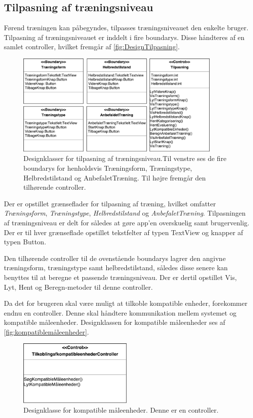 \subsection*{Tilpasning af træningsniveau}
Førend træningen kan påbegyndes, tilpasses træningsniveauet den enkelte bruger. Tilpasning af træningsniveauet er inddelt i fire boundarys. Disse håndteres af en samlet controller, hvilket fremgår af \autoref{fig:DesignTilpasning}.

\begin{figure} [H]
\centering
\includegraphics[width=0.9\textwidth]{figures/MVC/MVCTilpasning}
\caption{Designklasser for tilpasning af træningsniveau.Til venstre ses de fire boundarys for henholdsvis Træningsform, Træningstype, Helbredstilstand og AnbefaletTræning. Til højre fremgår den tilhørende controller.}
\label{fig:DesignTilpasning}
\end{figure}

\noindent
Der er opstillet grænseflader for tilpasning af træning, hvilket omfatter \textit{Træningsform}, \textit{Træningstype}, \textit{Helbredstilstand} og \textit{AnbefaletTræning}. Tilpasningen af træningsniveau er delt for således at gøre app’en overskuelig samt brugervenlig. Der er til hver grænseflade opstillet tekstfelter af typen TextView og knapper af typen Button.   

Den tilhørende controller til de ovenstående boundarys lagrer den angivne træningsform, træningstype samt helbredstilstand, således disse senere kan benyttes til at beregne et passende træningsniveau. Der er dertil opstillet Vis, Lyt, Hent og Beregn-metoder til denne controller. 

Da det for brugeren skal være muligt at tilkoble kompatible enheder, forekommer endnu en controller. Denne skal håndtere kommunikation mellem systemet og kompatible måleenheder. Designklassen for kompatible måleenheder ses af \autoref{fig:kompatiblemåleenheder}.

\begin{figure} [H]
\centering
\includegraphics[width=0.5\textwidth]{figures/MVC/MVCKompMaale}
\caption{Designklasse for kompatible måleenheder. Denne er en controller.}
\label{fig:kompatiblemåleenheder}
\end{figure}


